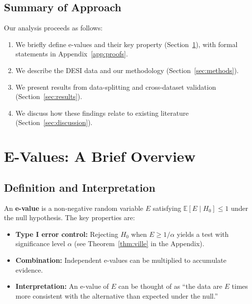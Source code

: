\documentclass[11pt,a4paper]{article}
\newcommand{\E}{\mathbb{E}}
\begin{document}
\subsection{Summary of Approach}

Our analysis proceeds as follows:
\begin{enumerate}
    \item We briefly define e-values and their key property (Section~\ref{sec:evalues}), with formal statements in Appendix~\ref{app:proofs}.

    \item We describe the DESI data and our methodology (Section~\ref{sec:methods}).

    \item We present results from data-splitting and cross-dataset validation (Section~\ref{sec:results}).

    \item We discuss how these findings relate to existing literature (Section~\ref{sec:discussion}).
\end{enumerate}

\section{E-Values: A Brief Overview}
\label{sec:evalues}

\subsection{Definition and Interpretation}

An \textbf{e-value} is a non-negative random variable $E$ satisfying $\E[E \mid H_0] \leq 1$ under the null hypothesis. The key properties are:
\begin{itemize}
    \item \textbf{Type I error control:} Rejecting $H_0$ when $E \geq 1/\alpha$ yields a test with significance level $\alpha$ (see Theorem~\ref{thm:ville} in the Appendix).

    \item \textbf{Combination:} Independent e-values can be multiplied to accumulate evidence.

    \item \textbf{Interpretation:} An e-value of $E$ can be thought of as ``the data are $E$ times more consistent with the alternative than expected under the null.''
\end{itemize}
\end{document}
